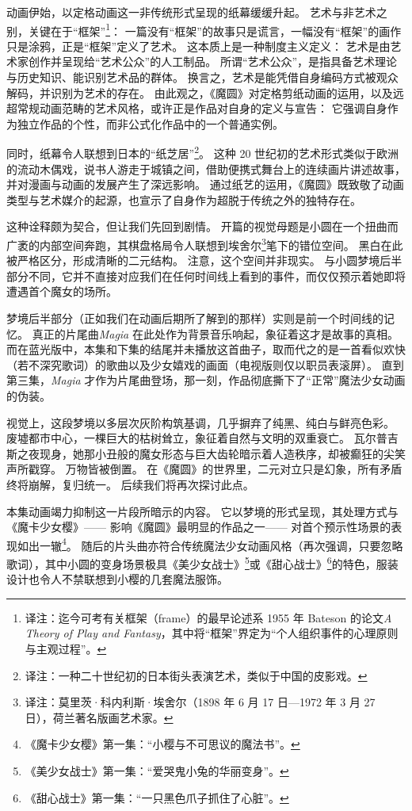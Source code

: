 动画伊始，以定格动画这一非传统形式呈现的纸幕缓缓升起。
艺术与非艺术之别，关键在于“框架”\footnote{%
    译注：迄今可考有关框架（frame）的最早论述系 1955 年 Bateson 的论文\emph{A Theory of Play and Fantasy}，其中将“框架”界定为“个人组织事件的心理原则与主观过程”。
}：
一篇没有“框架”的故事只是谎言，一幅没有“框架”的画作只是涂鸦，正是“框架”定义了艺术。
这本质上是一种制度主义定义：
艺术是由艺术家创作并呈现给“艺术公众”的人工制品。
所谓“艺术公众”，是指具备艺术理论与历史知识、能识别艺术品的群体\cite{ref9}。
换言之，艺术是能凭借自身编码方式被观众解码，并识别为艺术的存在。
由此观之，《魔圆》对定格剪纸动画的运用，以及远超常规动画范畴的艺术风格，或许正是作品对自身的定义与宣告：
它强调自身作为独立作品的个性，而非公式化作品中的一个普通实例。

同时，纸幕令人联想到日本的“纸芝居”\footnote{%
    译注：一种二十世纪初的日本街头表演艺术，类似于中国的皮影戏。
}。
这种 20 世纪初的艺术形式类似于欧洲的流动木偶戏，说书人游走于城镇之间，借助便携式舞台上的连续画片讲述故事\cite{ref10}，并对漫画与动画的发展产生了深远影响\cite{ref10}。
通过纸艺的运用，《魔圆》既致敬了动画类型与艺术媒介的起源，也宣示了自身作为超脱于传统之外的独特存在。

这种诠释颇为契合，但让我们先回到剧情。
开篇的视觉母题是小圆在一个扭曲而广袤的内部空间奔跑，其棋盘格局令人联想到埃舍尔\footnote{%
    译注：莫里茨·科内利斯·埃舍尔（1898 年 6 月 17 日—1972 年 3 月 27 日），荷兰著名版画艺术家。
}笔下的错位空间。
黑白在此被严格区分，形成清晰的二元结构。
注意，这个空间并非现实。
与小圆梦境后半部分不同，它并不直接对应我们在任何时间线上看到的事件，而仅仅预示着她即将遭遇首个魔女的场所。

梦境后半部分（正如我们在动画后期所了解到的那样）实则是前一个时间线的记忆。
真正的片尾曲\emph{Magia} 在此处作为背景音乐响起，象征着这才是故事的真相。
而在蓝光版中，本集和下集的结尾并未播放这首曲子，取而代之的是一首看似欢快（若不深究歌词）的歌曲以及少女嬉戏的画面（电视版则仅以职员表滚屏）。
直到第三集，\emph{Magia} 才作为片尾曲登场，那一刻，作品彻底撕下了“正常”魔法少女动画的伪装。

视觉上，这段梦境以多层次灰阶构筑基调，几乎摒弃了纯黑、纯白与鲜亮色彩。
废墟都市中心，一棵巨大的枯树耸立，象征着自然与文明的双重衰亡。
瓦尔普吉斯之夜现身，她那小丑般的魔女形态与巨大齿轮暗示着人造秩序，却被癫狂的尖笑声所戳穿。
万物皆被倒置。
在《魔圆》的世界里，二元对立只是幻象，所有矛盾终将崩解，复归统一。
后续我们将再次探讨此点。

本集动画竭力抑制这一片段所暗示的内容。
它以梦境的形式呈现，其处理方式与《魔卡少女樱》——
影响《魔圆》最明显的作品之一——
对首个预示性场景的表现如出一辙\footnote{%
    《魔卡少女樱》第一集：“小樱与不可思议的魔法书”。
}\cite{ref11}。
随后的片头曲亦符合传统魔法少女动画风格（再次强调，只要忽略歌词），其中小圆的变身场景极具《美少女战士》\footnote{%
    《美少女战士》第一集：“爱哭鬼小兔的华丽变身”。
}\cite{ref12}或《甜心战士》\footnote{%
    《甜心战士》第一集：“一只黑色爪子抓住了心脏”。
}\cite{ref13}的特色，服装设计也令人不禁联想到小樱的几套魔法服饰。

